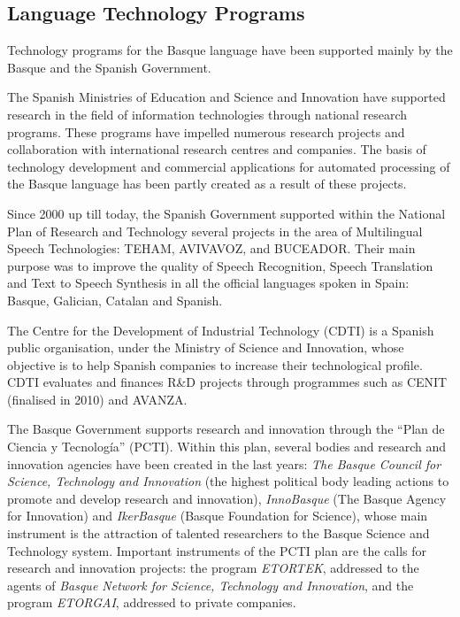 \begin{multicols}{2}
\subsection{Language Technology Programs}
    Technology programs for the Basque language have been supported mainly by the Basque and the Spanish Government. 

The Spanish Ministries of Education and Science and Innovation have supported research in the field of information technologies through national research programs. These programs have impelled numerous research projects and collaboration with international research centres and companies. The basis of technology development and commercial applications for automated processing of the Basque language has been partly created as a result of these projects.

Since 2000 up till today, the Spanish Government supported within the National Plan of Research and Technology several projects in the area of Multilingual Speech Technologies: TEHAM, AVIVAVOZ, and BUCEADOR. Their main purpose was to improve the quality of Speech Recognition, Speech Translation and Text to Speech Synthesis in all the official languages spoken in Spain: Basque, Galician, Catalan and Spanish.

The Centre for the Development of Industrial Technology (CDTI) is a Spanish public organisation, under the Ministry of Science and Innovation, whose objective is to help Spanish companies to increase their technological profile. CDTI evaluates and finances R\&D projects through programmes such as CENIT (finalised in 2010) and AVANZA.

The Basque Government supports research and innovation through the “Plan de Ciencia y Tecnología” (PCTI). Within this plan, several bodies and research and innovation agencies have been created in the last years: \textit{The Basque Council for Science, Technology and Innovation} (the highest political body leading actions to promote and develop research and innovation), \textit{InnoBasque} (The Basque Agency for Innovation) and \textit{IkerBasque} (Basque Foundation for Science), whose main instrument is the attraction of talented researchers to the Basque Science and Technology system.  Important instruments of the PCTI plan are the calls for research and innovation projects: the program \textit{ETORTEK}, addressed to the agents of\textit{ Basque Network for Science, Technology and Innovation}, and the program \textit{ETORGAI}, addressed to private companies. 


\end{multicols}
